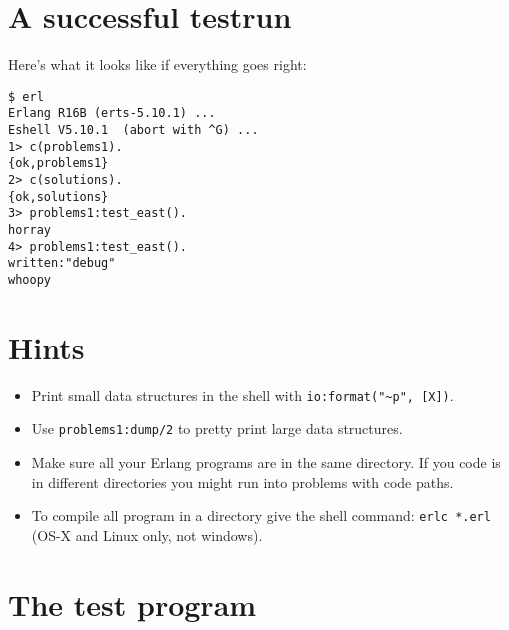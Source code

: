 \documentclass[12pt]{hitec}
\begin{document}
\section{A successful testrun}

Here's what it looks like if everything goes right:

\begin{Verbatim}[frame=single]
$ erl
Erlang R16B (erts-5.10.1) ...
Eshell V5.10.1  (abort with ^G) ...
1> c(problems1).
{ok,problems1}
2> c(solutions).
{ok,solutions}
3> problems1:test_east().
horray
4> problems1:test_east().
written:"debug"
whoopy
\end{Verbatim}

\section{Hints}

\begin{itemize}

\item Print small data structures in the shell with \verb+io:format("~p", [X])+.

\item Use \verb+problems1:dump/2+ to pretty print large data structures.

\item Make sure all your Erlang programs are in the same directory.
If you code is in different directories you might run into problems with code paths.

\item To compile all program in a directory give the shell command:
\verb+erlc *.erl+ (OS-X and Linux only, not windows).
\end{itemize}


\section{The test program}

\end{document}
